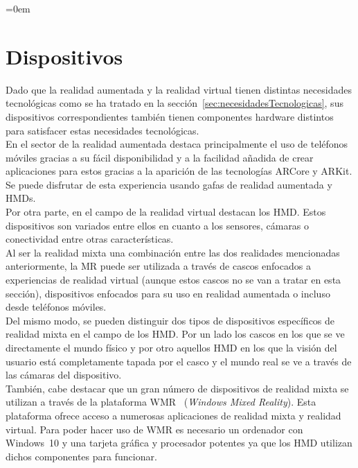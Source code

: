 \parindent=0em
\section{Dispositivos}
\noindent

Dado que la realidad aumentada y la realidad virtual tienen distintas necesidades tecnológicas como se ha tratado en la sección~\ref{sec:necesidadesTecnologicas}, sus dispositivos correspondientes también tienen componentes hardware distintos para satisfacer estas necesidades tecnológicas.\\

En el sector de la realidad aumentada destaca principalmente el uso de teléfonos móviles gracias a su fácil disponibilidad y a la facilidad añadida de crear aplicaciones para estos gracias a la aparición de las tecnologías ARCore y ARKit. Se puede disfrutar de esta experiencia usando gafas de realidad aumentada y HMDs.\\

Por otra parte, en el campo de la realidad virtual destacan los HMD. Estos dispositivos son variados entre ellos en cuanto a los sensores, cámaras o conectividad entre otras características.\\

Al ser la realidad mixta una combinación entre las dos realidades mencionadas anteriormente, la MR puede ser utilizada a través de cascos enfocados a experiencias de realidad virtual (aunque estos cascos no se van a tratar en esta sección), dispositivos enfocados para su uso en realidad aumentada o incluso desde teléfonos móviles.\\

Del mismo modo, se pueden distinguir dos tipos de dispositivos específicos de realidad mixta en el campo de los HMD. Por un lado los cascos en los que se ve directamente el mundo físico y por otro aquellos HMD en los que la visión del usuario está completamente tapada por el casco y el mundo real se ve a través de las cámaras del dispositivo.\\



También, cabe destacar que un gran número de dispositivos de realidad mixta se utilizan a través de la plataforma WMR\footnotemark~  (\textit{Windows Mixed Reality}). Esta plataforma ofrece acceso a numerosas aplicaciones de realidad mixta y realidad virtual. Para poder hacer uso de WMR es necesario un ordenador con Windows~10 y una tarjeta gráfica y procesador potentes ya que los HMD utilizan dichos componentes para funcionar.\\

